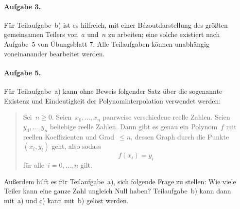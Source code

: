 \documentclass{../algblatt}
\begin{document}
\paragraph{Aufgabe 3.} Für Teilaufgabe~b) ist es hilfreich, mit einer
Bézoutdarstellung des größten gemeinsamen Teilers von~$a$ und~$n$ zu arbeiten;
eine solche existiert nach Aufgabe~5 von Übungsblatt 7. Alle Teilaufgaben
können unabhängig voneinanander bearbeitet werden.

\paragraph{Aufgabe 5.} Für Teilaufgabe~a) kann ohne Beweis folgender Satz
über die sogenannte Existenz und Eindeutigkeit der Polynominterpolation verwendet werden:
\begin{quote}
Sei~$n \geq 0$. Seien~$x_0, \ldots, x_n$ paarweise verschiedene reelle Zahlen. Seien~$y_0,
\ldots, y_n$ beliebige reelle Zahlen. Dann gibt es genau ein Polynom~$f$ mit
reellen Koeffizienten und Grad~$\leq n$, dessen Graph durch die Punkte~$(x_i,
y_i)$ geht, also sodass
\[ f(x_i) = y_i \]
für alle~$i = 0,\ldots,n$ gilt.
\end{quote}
Außerdem hilft es für Teilaufgabe~a), sich
folgende Frage zu stellen: Wie viele Teiler kann eine ganze Zahl ungleich Null
haben?
Teilaufgabe~b) kann dann mit~a) und c) kann mit~b) gelöst werden.
\end{document}
